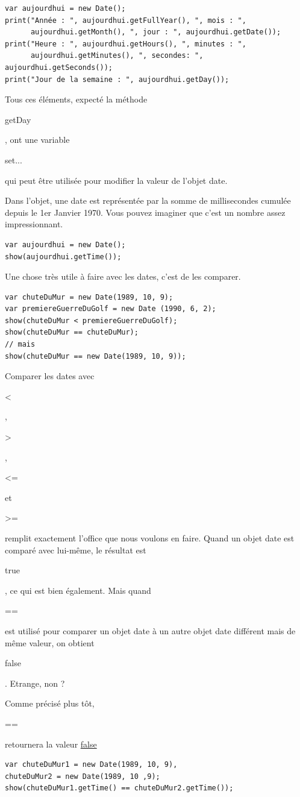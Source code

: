 \documentclass{FramateX}
\renewcommand{\texttt}[1]{\begin{sffamily}{#1}\end{sffamily}}
\begin{document}
\begin{lstlisting}
var aujourdhui = new Date();
print("Année : ", aujourdhui.getFullYear(), ", mois : ",
      aujourdhui.getMonth(), ", jour : ", aujourdhui.getDate());
print("Heure : ", aujourdhui.getHours(), ", minutes : ",
      aujourdhui.getMinutes(), ", secondes: ", aujourdhui.getSeconds());
print("Jour de la semaine : ", aujourdhui.getDay());
\end{lstlisting}
Tous ces éléments, expecté la méthode \texttt{getDay}, ont une variable
\texttt{set...} qui peut être utilisée pour modifier la valeur de
l'objet date.

Dans l'objet, une date est représentée par la somme de millisecondes
cumulée depuis le 1er Janvier 1970. Vous pouvez imaginer que c'est un
nombre assez impressionnant.

\begin{lstlisting}
var aujourdhui = new Date();
show(aujourdhui.getTime());
\end{lstlisting}
Une chose très utile à faire avec les dates, c'est de les comparer.

\begin{lstlisting}
var chuteDuMur = new Date(1989, 10, 9);
var premiereGuerreDuGolf = new Date (1990, 6, 2);
show(chuteDuMur < premiereGuerreDuGolf);
show(chuteDuMur == chuteDuMur);
// mais
show(chuteDuMur == new Date(1989, 10, 9));
\end{lstlisting}
Comparer les dates avec \texttt{\textless{}}, \texttt{\textgreater{}},
\texttt{\textless{}=} et \texttt{\textgreater{}=} remplit exactement
l'office que nous voulons en faire. Quand un objet date est comparé avec
lui-même, le résultat est \texttt{true}, ce qui est bien également. Mais
quand \texttt{==} est utilisé pour comparer un objet date à un autre
objet date différent mais de même valeur, on obtient \texttt{false}.
Etrange, non ?

Comme précisé plus tôt, \texttt{==} retournera la valeur
\href{lors\%20de\%20la\%0Acomparaison\%20de\%20deux\%20éléments\%20différents,\%20même\%20si\%20ces\%20deux\%20éléments\%0Acontiennent\%20les\%20mêmes\%20propriétés.\%20Ceci\%20est\%20un\%20peu\%20maladroit\%20et\%20sujet\%0Aà\%20erreur,\%20puisqu''on\%20s'attendrait\%20à\%20ce\%20que\%20\textbar{}\textgreater{}=\textbar{}\%20et\%20\textbar{}==\textbar{}\%20aient\%20le\%20même\%0Acomportement.\%20Pour\%20tester\%20si\%20deux\%20dates\%20sont\%20égales,\%20peut\%20être\%20fait\%20de\%0Acette\%20manière\%A0:}{false}

\begin{lstlisting}
var chuteDuMur1 = new Date(1989, 10, 9),
chuteDuMur2 = new Date(1989, 10 ,9);
show(chuteDuMur1.getTime() == chuteDuMur2.getTime());
\end{lstlisting}
\begin{center}\end{center}
\end{document}
